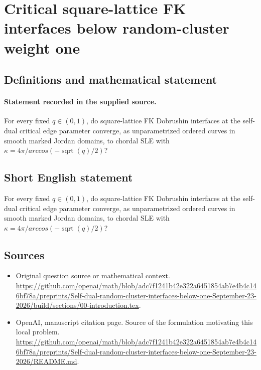 \documentclass[11pt]{article}
\begin{document}
\section*{Critical square-lattice FK interfaces below random-cluster weight one}\label{30007359}
\subsection{Definitions and mathematical statement}
\paragraph{Statement recorded in the supplied source.}
For every fixed $q\in (0,1)$, do square-lattice FK Dobrushin interfaces at the self-dual critical edge parameter converge, as unparametrized ordered curves in smooth marked Jordan domains, to chordal SLE with $\kappa =4\pi /arccos(-\operatorname{sqrt}(q)/2)$?
\subsection{Short English statement}
For every fixed $q\in (0,1)$, do square-lattice FK Dobrushin interfaces at the self-dual critical edge parameter converge, as unparametrized ordered curves in smooth marked Jordan domains, to chordal SLE with $\kappa =4\pi /arccos(-\operatorname{sqrt}(q)/2)$?
\subsection{Sources}
\begin{itemize}
\item[S1] Original question source or mathematical context.
\url{https://github.com/openai/math/blob/adc7f1241b42e322a6451854ab7e4b4c146bf78a/preprints/Self-dual-random-cluster-interfaces-below-one-September-23-2026/build/sections/00-introduction.tex}.
\item[S2] OpenAI, manuscript citation page. Source of the formulation motivating this local problem.
\url{https://github.com/openai/math/blob/adc7f1241b42e322a6451854ab7e4b4c146bf78a/preprints/Self-dual-random-cluster-interfaces-below-one-September-23-2026/README.md}.
\end{itemize}
\end{document}
